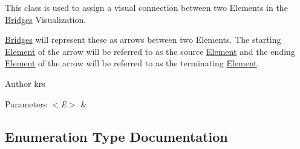 This class is used to assign a visual connection between two Elements in the \hyperlink{namespacebridges_1_1_bridges}{Bridges} Visualization. 

\hyperlink{namespacebridges_1_1_bridges}{Bridges} will represent these as arrows between two Elements. The starting \hyperlink{classbridges_1_1_element}{Element} of the arrow will be referred to as the source \hyperlink{classbridges_1_1_element}{Element} and the ending \hyperlink{classbridges_1_1_element}{Element} of the arrow will be referred to as the terminating \hyperlink{classbridges_1_1_element}{Element}.

\begin{DoxyAuthor}{Author}
krs
\end{DoxyAuthor}

\begin{DoxyParams}{Parameters}
{\em $<$\+E$>$} & \\
\hline
\end{DoxyParams}


\subsection{Enumeration Type Documentation}
\hypertarget{namespacebridges_a1b4050586bd708782ae0d4f3b06b9579}{}

